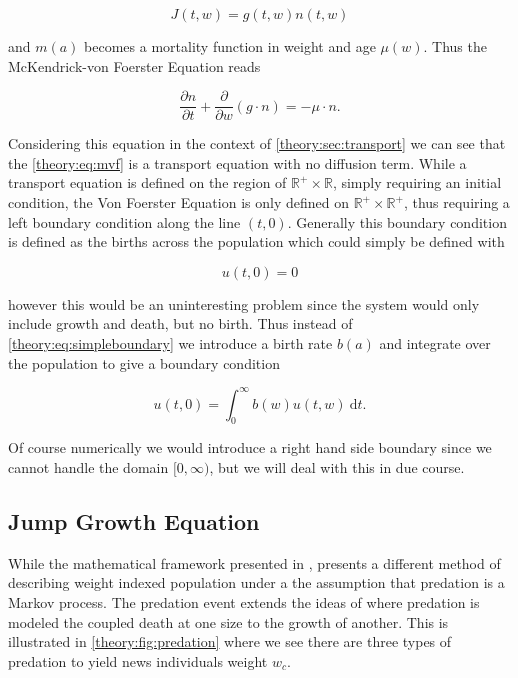 \documentclass[../main]{subfiles}
\begin{document}
  \begin{equation}
    J(t, w) = g(t, w) n(t, w)
  \end{equation}

  and $m(a)$ becomes a mortality function in weight and age $\mu(w)$. Thus the McKendrick-von Foerster Equation reads

  \begin{equation}\label{theory:eq:mvf}
    \frac{\partial n}{\partial t} + \frac{\partial}{\partial w} \left(g \cdot n \right) = - \mu \cdot n.
  \end{equation}

  Considering this equation in the context of \autoref{theory:sec:transport} we can see that the \autoref{theory:eq:mvf} is a transport equation with no diffusion term. While a transport equation is defined on the region of $\mathbb{R^+} \times \mathbb{R}$, simply requiring an initial condition, the Von Foerster Equation is only defined on $\mathbb{R^+} \times \mathbb{R^+}$, thus requiring a left boundary condition along the line $(t, 0)$. Generally this boundary condition is defined as the births across the population which could simply be defined with

  \begin{equation}\label{theory:eq:simpleboundary}
    u(t, 0) = 0
  \end{equation}

  however this would be an uninteresting problem since the system would only include growth and death, but no birth. Thus instead of \autoref{theory:eq:simpleboundary} we introduce a birth rate $b(a)$ and integrate over the population to give a boundary condition

  \begin{equation}\label{theory:eq:boundary}
    u(t, 0) = \int_0^{\infty} b(w) u(t, w) \: \mathrm{d}t.
  \end{equation}

  Of course numerically we would introduce a right hand side boundary since we cannot handle the domain $[0, \infty)$, but we will deal with this in due course.

  \subsection{Jump Growth Equation}\label{theory:sec:jumpgrowth}
  While the mathematical framework presented in \cite{silvert1978}, \cite{datta2010} presents a different method of describing weight indexed population under a the assumption that predation is a Markov process. The predation event extends the ideas of \cite{silvert1980} where predation is modeled the coupled death at one size to the growth of another. This is illustrated in \autoref{theory:fig:predation} where we see there are three types of predation to yield news individuals weight $w_c$.
\end{document}
